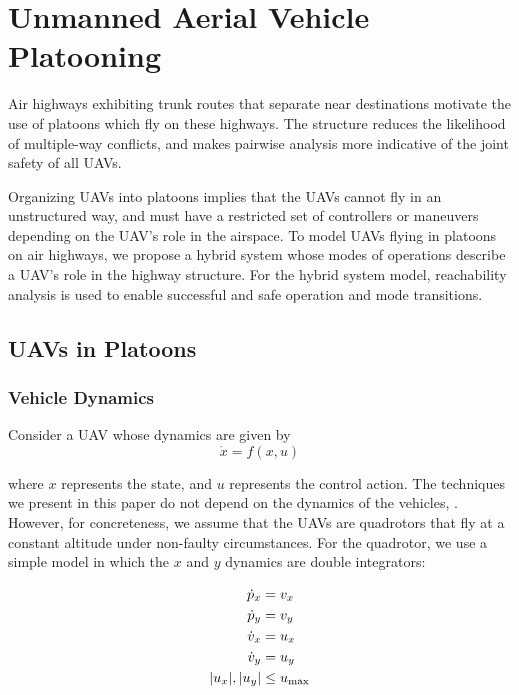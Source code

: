 \section{Unmanned Aerial Vehicle Platooning \label{sec:platooning}}
Air highways exhibiting trunk routes that separate near destinations motivate the use of platoons which fly on these highways.  The structure reduces the likelihood of multiple-way conflicts, and makes pairwise analysis more indicative of the joint safety of all UAVs. 

Organizing UAVs into platoons implies that the UAVs cannot fly in an unstructured way, and must have a restricted set of controllers or maneuvers depending on the UAV's role in the airspace. To model UAVs flying in platoons on air highways, we propose a hybrid system whose modes of operations describe a UAV's role in the highway structure. For the hybrid system model, reachability analysis is used to enable successful and safe operation and mode transitions.

\subsection{UAVs in Platoons}
\subsubsection{Vehicle Dynamics}
Consider a UAV whose dynamics are given by
\begin{equation}
\label{eq:veh_dyn}
\dot{x} = f(x,u)
\end{equation}

\noindent where $x$ represents the state, and $u$ represents the control action. The techniques we present in this paper do not depend on the dynamics of the vehicles, . However, for concreteness, we assume that the UAVs are quadrotors that fly at a constant altitude under non-faulty circumstances. For the quadrotor, we use a simple model in which the $x$ and $y$ dynamics are double integrators:

\begin{equation} \label{eq:dyn}
\begin{aligned}
\dot{p}_x &= v_x \\
\dot{p}_y &= v_y  \\
\dot{v}_x &= u_x \\
\dot{v}_y &= u_y \\
|u_x|,|u_y| &\le u_\text{max}
\end{aligned}
\end{equation}

